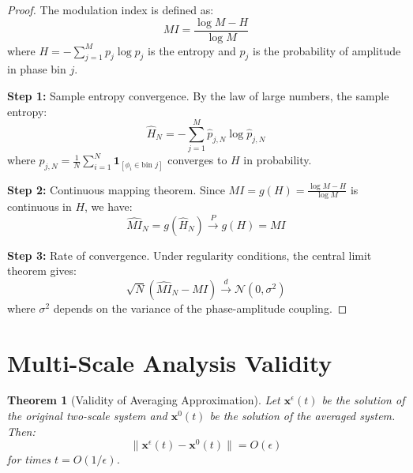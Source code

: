 \documentclass{article}
\newtheorem{theorem}{Theorem}
\begin{document}
\begin{proof}
The modulation index is defined as:
\begin{equation}
MI = \frac{\log M - H}{\log M}
\end{equation}
where $H = -\sum_{j=1}^M p_j \log p_j$ is the entropy and $p_j$ is the probability of amplitude in phase bin $j$.

\textbf{Step 1:} Sample entropy convergence. By the law of large numbers, the sample entropy:
\begin{equation}
\hat{H}_N = -\sum_{j=1}^M \hat{p}_{j,N} \log \hat{p}_{j,N}
\end{equation}
where $\hat{p}_{j,N} = \frac{1}{N}\sum_{i=1}^N \mathbf{1}_{[\phi_i \in \text{bin } j]}$ converges to $H$ in probability.

\textbf{Step 2:} Continuous mapping theorem. Since $MI = g(H) = \frac{\log M - H}{\log M}$ is continuous in $H$, we have:
\begin{equation}
\hat{MI}_N = g(\hat{H}_N) \xrightarrow{P} g(H) = MI
\end{equation}

\textbf{Step 3:} Rate of convergence. Under regularity conditions, the central limit theorem gives:
\begin{equation}
\sqrt{N}(\hat{MI}_N - MI) \xrightarrow{d} \mathcal{N}(0, \sigma^2)
\end{equation}
where $\sigma^2$ depends on the variance of the phase-amplitude coupling.
\end{proof}

\section{Multi-Scale Analysis Validity}

\begin{theorem}[Validity of Averaging Approximation]
Let $\mathbf{x}^\epsilon(t)$ be the solution of the original two-scale system and $\mathbf{x}^0(t)$ be the solution of the averaged system. Then:
\begin{equation}
\|\mathbf{x}^\epsilon(t) - \mathbf{x}^0(t)\| = O(\epsilon)
\end{equation}
for times $t = O(1/\epsilon)$.
\end{theorem}
\end{document}
